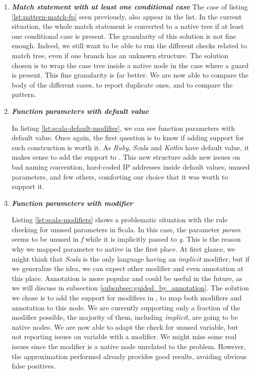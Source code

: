 \begin{enumerate}
	\item \textbf{\textit{Match statement with at least one conditional case}} \newline 
	The case of listing \ref{lst:pattern-match-fp} seen previously, also appear in the list. 
	In the current situation, the whole match statement is converted to a native tree if at least one conditional case is present. 
	The granularity of this solution is not fine enough.
	Indeed, we still want to be able to run the different checks related to match tree, even if one branch has an unknown structure.
	The solution chosen is to wrap the case tree inside a native node in the case where a guard is present.
	This fine granularity is far better.
	We are now able to compare the body of the different cases, to report duplicate ones, and to compare the pattern.
	
	\item \textbf{\textit{Function parameters with default value}} 
	
	
	In listing \ref{lst:scala-default-modifier}, we can see function parameters with default value. Once again, the first question is to know if adding support for such construction is worth it. 
	As \emph{Ruby}, \emph{Scala} and \emph{Kotlin} have default value, it makes sense to add the support to \slang{}. 
	This new structure adds new issues on bad naming convention, hard-coded IP addresses inside default values, unused parameters, and few others, comforting our choice that it was worth to support it.

	\item \textbf{\textit{Function parameters with modifier}} 
	 
	
	Listing \ref{lst:scala-modifiers} shows a problematic situation with the rule checking for unused parameters in Scala. In this case, the parameter \emph{param} seems to be unused in \emph{f} while it is implicitly passed to \emph{g}.
	This is the reason why we mapped parameter to native in the first place.
	At first glance, we might think that \emph{Scala} is the only language having an \emph{implicit} modifier, but if we generalize the idea, we can expect other modifier and even annotation at this place. 
	Annotation is more popular and could be useful in the future, as we will discuss in subsection \ref{subsubsec:guided_by_annotation}.
	The solution we chose is to add the support for modifiers in \slang{}, to map both modifiers and annotation to this node.
	We are currently supporting only a fraction of the modifier possible, the majority of them, including \emph{implicit}, are going to be native nodes.
	We are now able to adapt the check for unused variable, but not reporting issues on variable with a modifier. 
	We might miss some real issues since the modifier is a native node unrelated to the problem.
	However, the approximation performed already provides good results, avoiding obvious false positives.
\end{enumerate}

